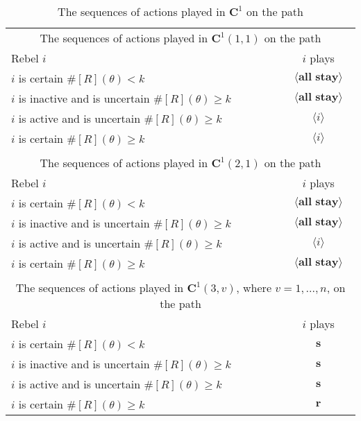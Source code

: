 \documentclass[12pt,letter]{article}
\newcommand{\Kappa}{\mathbf{C}}
\theoremstyle{definition}
\theoremstyle{remark}
\theoremstyle{claim}
\begin{document}
\begin{table}[!htbp]
\caption{The sequences of actions played in $\Kappa^1$ on the path}
\label{Table_cd0}
\begin{center}
\begin{tabular}{l c}
\multicolumn{2}{c}{The sequences of actions played in $\Kappa^1(1,1)$ on the path}\\
Rebel $i$ 	 	&  	$i$ plays		 \\
\hline
\hline
$i$ is certain $\#[R](\theta)<k$ 	& 	$\langle \textbf{all stay} \rangle$	\\
$i$ is inactive and is uncertain $\#[R](\theta)\geq k$	& 	$\langle \textbf{all stay} \rangle$	\\
$i$ is active and is uncertain $\#[R](\theta)\geq k$ &  $\langle i \rangle$  \\
$i$ is certain $\#[R](\theta)\geq k$ &  $\langle i \rangle$  \\
\hline
\\
\multicolumn{2}{c}{The sequences of actions played in $\Kappa^1(2,1)$ on the path}\\
Rebel $i$ 	 	&  	$i$ plays		 \\
\hline
\hline
$i$ is certain $\#[R](\theta)<k$ 	& 	$\langle \textbf{all stay} \rangle$	\\
$i$ is inactive and is uncertain $\#[R](\theta)\geq k$	& 	$\langle \textbf{all stay} \rangle$	\\
$i$ is active and is uncertain $\#[R](\theta)\geq k$ &  $\langle i \rangle$  \\
$i$ is certain $\#[R](\theta)\geq k$ &  $\langle \textbf{all stay} \rangle$  \\
\hline
\\
\multicolumn{2}{c}{The sequences of actions played in $\Kappa^1(3,v)$, where $v=1,...,n$, on the path}\\
Rebel $i$ 	 	&  	$i$ plays		 \\
\hline
\hline
$i$ is certain $\#[R](\theta)<k$ 	& 	$ \textbf{s} $	\\
$i$ is inactive and is uncertain $\#[R](\theta)\geq k$	& 	$ \textbf{s} $	\\
$i$ is active and is uncertain $\#[R](\theta)\geq k$ &  $ \textbf{s} $  \\
$i$ is certain $\#[R](\theta)\geq k$ &  $ \textbf{r} $  \\
\hline
\end{tabular}
\end{center}
\end{table}
\end{document}
